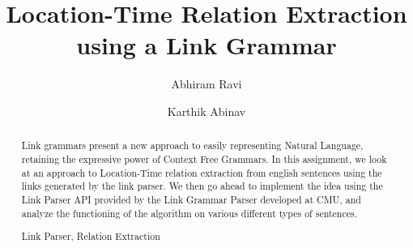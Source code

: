 \documentclass[runningheads,a4paper,11pt]{llncs}
\newcommand{\keywords}[1]{\par\addvspace\baselineskip
\noindent\keywordname\enspace\ignorespaces#1}
\begin{document}
\mainmatter  %

\title{Location-Time Relation Extraction using a Link Grammar}


%
%
\author{Abhiram Ravi \and Karthik Abinav}
%


%
%

\maketitle


 \begin{abstract}
 {\small Link grammars present a new approach to easily representing Natural Language, retaining the expressive power of Context Free Grammars. In this assignment, we look at an 
approach to Location-Time relation extraction from english sentences using the links generated by the link parser. We then go ahead to implement the idea using the Link Parser
API provided by the Link Grammar Parser developed at CMU, and analyze the functioning of the algorithm on various different types of sentences.}
\keywords{Link Parser, Relation Extraction} 
\end{abstract}
\end{document}
